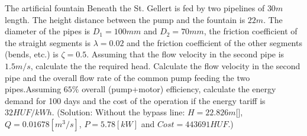 The artificial fountain Beneath the St. Gellert  is fed by two pipelines of $30m$ length. The height distance between the pump and the fountain is $22m$. The diameter of the pipes is $D_1=100mm$ and $D_2=70mm$, the friction coefficient of the straight segments is $\lambda=0.02$ and the friction coefficient of the other segments (bends, etc.) is $\zeta=0.5$. Assuming that the flow velocity in the second pipe is $1.5m/s$, calculate the the required head. Calculate the flow velocity in the second pipe and the overall flow rate of the common pump feeding the two pipes.Assuming $65\%$ overall (pump+motor) efficiency, calculate the energy demand for 100 days and the cost of the operation if the energy tariff is $32 HUF/kWh$. (Solution: Without the bypass line: $H=22.826m[$], $Q=0.01678[m^3/s]$, $P=5.78[kW]$ and $Cost=443691HUF$.)

\newpage

